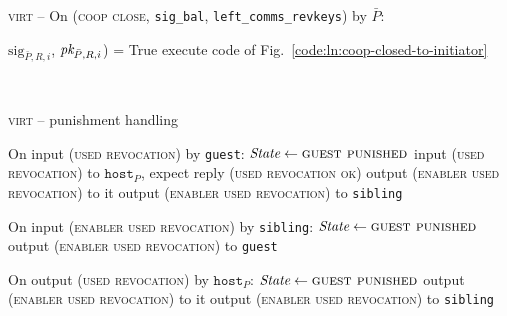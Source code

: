 \begin{center}
\begin{processbox}{\textsc{virt} -- On (\textsc{coop close},
  \texttt{sig\_bal}, \texttt{left\_comms\_revkeys}) by $\bar{P}$:}
\begin{algorithmic}[1]
{        $\mathrm{sig}_{\bar{P}, R, i}$, $\textit{pk}_{\bar{P}, R, i}$) = True}
        \State {}
         
          \State execute code of Fig.~\ref{code:ln:coop-closed-to-initiator}
        \Else \: 
          \State {}
        \EndIf
      \EndIf
    \end{algorithmic}
  \end{processbox}
  \label{code:virtual-layer:coop-close-intermediary}
\end{center} \ \\

\begin{center}
  \begin{processbox}{\textsc{virt} -- punishment handling}
    \begin{algorithmic}[1]
      \State On input (\textsc{used revocation}) by \texttt{guest}:
      \label{code:virtual-layer:punishment:when-punished-1}
      \Indent
        \State $\textit{State} \gets \textsc{guest punished}$
        \State input (\textsc{used revocation}) to $\texttt{host}_P$, expect
        reply (\textsc{used revocation ok})
          \State output (\textsc{enabler used revocation}) to it
        \Else \: 
          \State output (\textsc{enabler used revocation}) to \texttt{sibling}
        \EndIf
      \EndIndent
      \Statex

      \State On input (\textsc{enabler used revocation}) by \texttt{sibling}:
      \Indent
        \State $\textit{State} \gets \textsc{guest punished}$
        \State output (\textsc{enabler used revocation}) to \texttt{guest}
      \EndIndent
      \Statex

      \State On output (\textsc{used revocation}) by $\texttt{host}_P$:
      \label{code:virtual-layer:punishment:when-punished-2}
      \Indent
        \State $\itistate \gets \textsc{guest punished}$
          \State output (\textsc{enabler used revocation}) to it
        \Else \: 
          \State output (\textsc{enabler used revocation}) to \texttt{sibling}
        \EndIf
      \EndIndent
    \end{algorithmic}
  \end{processbox}
  \label{code:virtual-layer:punishment}
\end{center}
